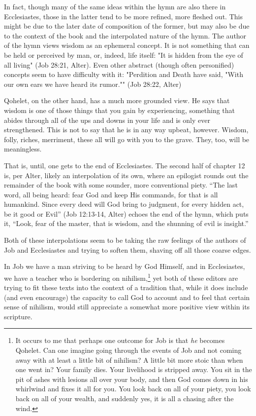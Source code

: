 In fact, though many of the same ideas within the hymn are also there in Ecclesiastes, those in the latter tend to be more refined, more fleshed out. This might be due to the later date of composition of the former, but may also be due to the context of the book and the interpolated nature of the hymn. The author of the hymn views wisdom as an ephemeral concept. It is not something that can be held or perceived by man, or, indeed, life itself: "It is hidden from the eye of all living" (Job 28:21, Alter). Even other abstract (though often personified) concepts seem to have difficulty with it: "Perdition and Death have said, "With our own ears we have heard its rumor."" (Job 28:22, Alter)

Qohelet, on the other hand, has a much more grounded view. He says that wisdom is one of those things that you gain by experiencing, something that abides through all of the ups and downs in your life and is only ever strengthened. This is not to say that he is in any way upbeat, however. Wisdom, folly, riches, merriment, these all will go with you to the grave. They, too, will be meaningless.

That is, until, one gets to the end of Ecclesiastes. The second half of chapter 12 is, per Alter, likely an interpolation of its own, where an epilogist rounds out the remainder of the book with some sounder, more conventional piety. ``The last word, all being heard: fear God and keep His commands, for that is all humankind. Since every deed will God bring to judgment, for every hidden act, be it good or Evil'' (Job 12:13-14, Alter) echoes the end of the hymn, which puts it, ``Look, fear of the master, that is wisdom, and the shunning of evil is insight.''

Both of these interpolations seem to be taking the raw feelings of the authors of Job and Ecclesiastes and trying to soften them, shaving off all those coarse edges.

In Job we have a man striving to be heard by God Himself, and in Ecclesiastes, we have a teacher who is bordering on nihilism,\footnote{It occurs to me that perhaps one outcome for Job is that \emph{he} becomes Qohelet. Can one imagine going through the events of Job and not coming away with at least a little bit of nihilism? A little bit more stoic than when one went in? Your family dies. Your livelihood is stripped away. You sit in the pit of ashes with lesions all over your body, and then God comes down in his whirlwind and fixes it all for you. You look back on all of your piety, you look back on all of your wealth, and suddenly yes, it is all a chasing after the wind.} yet both of these editors are trying to fit these texts into the context of a tradition that, while it does include (and even encourage) the capacity to call God to account and to feel that certain sense of nihilism, would still appreciate a somewhat more positive view within its scripture.

